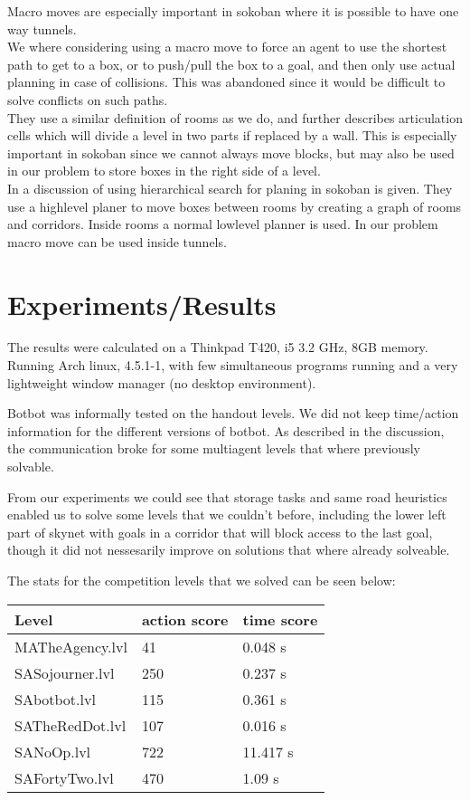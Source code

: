 \documentclass[letterpaper]{article}
\begin{document}
Macro moves are especially important in sokoban where it is possible to have
one way tunnels.\\

We where considering using a macro move to force an agent to use the shortest
path to get to a box, or to push/pull the box to a goal, and then only use actual
planning in case of collisions. This was abandoned since it would be difficult
to solve conflicts on such paths.\\

They use a similar definition of rooms as we do, and further describes articulation
cells which will divide a level in two parts if replaced by a wall. This is
especially important in sokoban since we cannot always move blocks, but may
also be used in our problem to store boxes in the right side of a level.\\

In \cite{highlevelSokoban} a discussion of using hierarchical search for
planing in sokoban is given. They use a highlevel planer to move boxes between
rooms by creating a graph of rooms and corridors. Inside rooms a normal lowlevel
planner is used. In our problem macro move can be used inside tunnels.

\section{Experiments/Results}
The results were calculated on a Thinkpad T420, i5 3.2 GHz, 8GB memory.
Running Arch linux, 4.5.1-1, with few simultaneous programs running and a very
lightweight window manager (no desktop environment).

Botbot was informally tested on the handout levels. We did not keep time/action
information for the different versions of botbot. As described in the discussion,
the communication broke for some multiagent levels that where previously solvable.

From our experiments we could see that storage tasks and same road heuristics enabled
us to solve some levels that we couldn't before, including the lower left part of skynet
with goals in a corridor that will block access to the last goal, though it did not
nessesarily improve on solutions that where already solveable.

The stats for the competition levels that we solved can be seen below:\\

\begin{tabular}{l|l|l}
Level & action score & time score \\
\hline
MATheAgency.lvl & 41 & 0.048 s\\
\hline
SASojourner.lvl & 250 & 0.237 s\\
SAbotbot.lvl & 115 & 0.361 s\\
SATheRedDot.lvl & 107 & 0.016 s\\
SANoOp.lvl & 722 &11.417 s\\
SAFortyTwo.lvl & 470 & 1.09 s\
\end{tabular}\\
\end{document}
